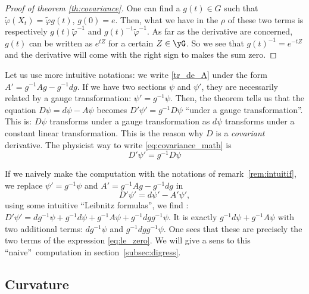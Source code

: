 \begin{proof}[Proof of theorem \ref{th:covariance}]
One can find a $g(t)\in G$ such that $\tilde{\varphi}(X_t)=\tilde{\varphi} g(t)$, $g(0)=e$. Then, what we have in the $\rho$ of these two terms is respectively $g(t)\tilde{\varphi}^{-1}$ and $g(t)^{-1}\tilde{\varphi}^{-1}$. As far as the derivative are concerned, $g(t)$ can be written as $e^{tZ}$ for a certain $Z\in\yG$. So we see that $g(t)^{-1}=e^{-tZ}$ and the derivative will come with the right sign to makes the sum zero.
\end{proof}

\begin{remark}
Let us use more intuitive notations: we write \eqref{tr_de_A} under the form $A'=g^{-1} Ag-g^{-1} dg$. If we have two sections  $\psi$ and $\psi'$, they are necessarily related by a gauge transformation: $\psi'=g^{-1}\psi$. Then, the theorem tells us that the equation $D\psi=d\psi-A\psi$ becomes $D'\psi'=g^{-1} D\psi$ ``under a gauge transformation''. This is: $D\psi$ transforms under a gauge transformation as $d\psi$ transforms under a constant linear transformation. This is the reason why $D$ is a \emph{covariant} derivative. The physicist way to write \eqref{eq:covariance_math} is
\begin{equation}\label{eq:covariance_phys}
    D'\psi'=g^{-1} D\psi
\end{equation}
\label{rem:intuitif}
\end{remark}

\begin{remark}
If we naively make the computation with the notations of remark~\ref{rem:intuitif}, we replace $\psi'=g^{-1}\psi$ and $A'=g^{-1} Ag-g^{-1} dg$ in
\[
  D'\psi'=d\psi'-A'\psi',
\]
using some intuitive ``Leibnitz formulas'', we find :
$D'\psi'=dg^{-1}\psi+g^{-1} d\psi+g^{-1} A\psi+g^{-1} dg g^{-1}\psi$. It is exactly $g^{-1} d\psi+g^{-1} A\psi$ with two additional terms: $dg^{-1}\psi$ and $g^{-1} dg g^{-1}\psi$. One sees that these are precisely the two terms of the expression \eqref{eq:le_zero}. We will give a sens to this ``naive''\ computation in section~\ref{subsec:digress}.
\end{remark}

\subsection{Curvature}

